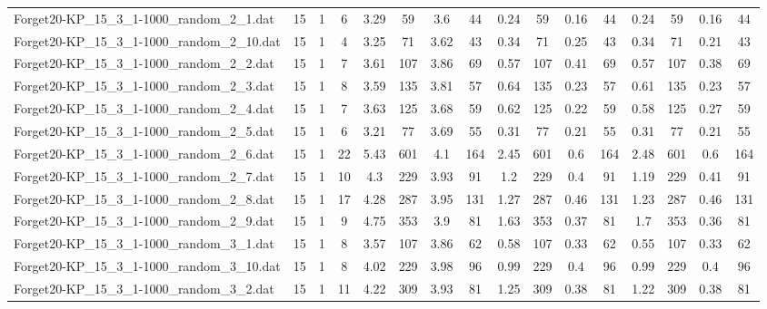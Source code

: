 \begin{sidewaystable}[!ht]
{\begin{tabular}{lccccccccccccccc}
Forget20-KP\_15\_3\_1-1000\_random\_2\_1.dat & 15 & 1 & 6 & 3.29 & 59 & 3.6 & 44 & 0.24 & 59 &  \textcolor{blue2}{0.16} & 44 & 0.24 & 59 &  \textcolor{blue2}{0.16} & 44 \\
Forget20-KP\_15\_3\_1-1000\_random\_2\_10.dat & 15 & 1 & 4 & 3.25 & 71 & 3.62 & 43 & 0.34 & 71 & 0.25 & 43 & 0.34 & 71 &  \textcolor{blue2}{0.21} & 43 \\
Forget20-KP\_15\_3\_1-1000\_random\_2\_2.dat & 15 & 1 & 7 & 3.61 & 107 & 3.86 & 69 & 0.57 & 107 & 0.41 & 69 & 0.57 & 107 &  \textcolor{blue2}{0.38} & 69 \\
Forget20-KP\_15\_3\_1-1000\_random\_2\_3.dat & 15 & 1 & 8 & 3.59 & 135 & 3.81 & 57 & 0.64 & 135 &  \textcolor{blue2}{0.23} & 57 & 0.61 & 135 &  \textcolor{blue2}{0.23} & 57 \\
Forget20-KP\_15\_3\_1-1000\_random\_2\_4.dat & 15 & 1 & 7 & 3.63 & 125 & 3.68 & 59 & 0.62 & 125 &  \textcolor{blue2}{0.22} & 59 & 0.58 & 125 & 0.27 & 59 \\
Forget20-KP\_15\_3\_1-1000\_random\_2\_5.dat & 15 & 1 & 6 & 3.21 & 77 & 3.69 & 55 & 0.31 & 77 &  \textcolor{blue2}{0.21} & 55 & 0.31 & 77 &  \textcolor{blue2}{0.21} & 55 \\
Forget20-KP\_15\_3\_1-1000\_random\_2\_6.dat & 15 & 1 & 22 & 5.43 & 601 & 4.1 & 164 & 2.45 & 601 &  \textcolor{blue2}{0.6} & 164 & 2.48 & 601 &  \textcolor{blue2}{0.6} & 164 \\
Forget20-KP\_15\_3\_1-1000\_random\_2\_7.dat & 15 & 1 & 10 & 4.3 & 229 & 3.93 & 91 & 1.2 & 229 &  \textcolor{blue2}{0.4} & 91 & 1.19 & 229 & 0.41 & 91 \\
Forget20-KP\_15\_3\_1-1000\_random\_2\_8.dat & 15 & 1 & 17 & 4.28 & 287 & 3.95 & 131 & 1.27 & 287 &  \textcolor{blue2}{0.46} & 131 & 1.23 & 287 &  \textcolor{blue2}{0.46} & 131 \\
Forget20-KP\_15\_3\_1-1000\_random\_2\_9.dat & 15 & 1 & 9 & 4.75 & 353 & 3.9 & 81 & 1.63 & 353 & 0.37 & 81 & 1.7 & 353 &  \textcolor{blue2}{0.36} & 81 \\
Forget20-KP\_15\_3\_1-1000\_random\_3\_1.dat & 15 & 1 & 8 & 3.57 & 107 & 3.86 & 62 & 0.58 & 107 &  \textcolor{blue2}{0.33} & 62 & 0.55 & 107 &  \textcolor{blue2}{0.33} & 62 \\
Forget20-KP\_15\_3\_1-1000\_random\_3\_10.dat & 15 & 1 & 8 & 4.02 & 229 & 3.98 & 96 & 0.99 & 229 &  \textcolor{blue2}{0.4} & 96 & 0.99 & 229 &  \textcolor{blue2}{0.4} & 96 \\
Forget20-KP\_15\_3\_1-1000\_random\_3\_2.dat & 15 & 1 & 11 & 4.22 & 309 & 3.93 & 81 & 1.25 & 309 &  \textcolor{blue2}{0.38} & 81 & 1.22 & 309 &  \textcolor{blue2}{0.38} & 81 \\

\end{tabular}}
\end{sidewaystable}
